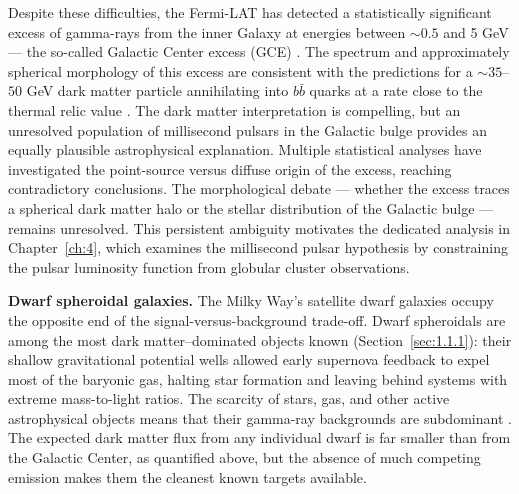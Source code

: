 Despite these difficulties, the Fermi-LAT has detected a statistically significant excess of gamma-rays from the inner Galaxy at energies between $\sim 0.5$ and 5 GeV --- the so-called Galactic Center excess (GCE) \cite{Goodenough:2009gk,Hooper:2010mq,Daylan:2014rsa}.
The spectrum and approximately spherical morphology of this excess are consistent with the predictions for a $\sim 35$--$50$ GeV dark matter particle annihilating into $b\bar{b}$ quarks at a rate close to the thermal relic value \cite{Daylan:2014rsa}.
The dark matter interpretation is compelling, but an unresolved population of millisecond pulsars in the Galactic bulge provides an equally plausible astrophysical explanation.
Multiple statistical analyses have investigated the point-source versus diffuse origin of the excess, reaching contradictory conclusions.
The morphological debate --- whether the excess traces a spherical dark matter halo or the stellar distribution of the Galactic bulge --- remains unresolved.
This persistent ambiguity motivates the dedicated analysis in Chapter~\ref{ch:4}, which examines the millisecond pulsar hypothesis by constraining the pulsar luminosity function from globular cluster observations.

\textbf{Dwarf spheroidal galaxies.}
The Milky Way's satellite dwarf galaxies occupy the opposite end of the signal-versus-background trade-off.
Dwarf spheroidals are among the most dark matter--dominated objects known (Section~\ref{sec:1.1.1}): their shallow gravitational potential wells allowed early supernova feedback to expel most of the baryonic gas, halting star formation and leaving behind systems with extreme mass-to-light ratios.
The scarcity of stars, gas, and other active astrophysical objects means that their gamma-ray backgrounds are subdominant \cite{Cirelli:2024ssz}.
The expected dark matter flux from any individual dwarf is far smaller than from the Galactic Center, as quantified above, but the absence of much competing emission makes them the cleanest known targets available.

